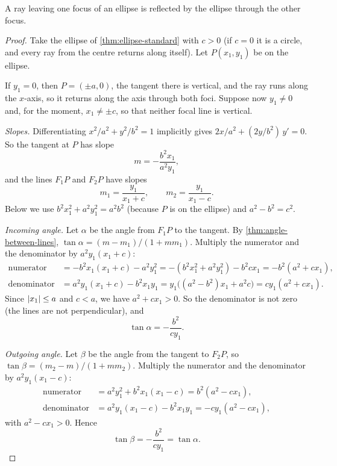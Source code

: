 \begin{theorem}\label{thm:ellipse-reflection}
  A ray leaving one focus of an ellipse is reflected by the ellipse through
  the other focus.
\end{theorem}

\begin{proof}
  Take the ellipse of \cref{thm:ellipse-standard} with $c > 0$ (if $c = 0$
  it is a circle, and every ray from the centre returns along itself). Let
  $P(x_1, y_1)$ be on the ellipse.

  If $y_1 = 0$, then $P = (\pm a, 0)$, the tangent there is vertical, and the
  ray runs along the $x$-axis, so it returns along the axis through both
  foci. Suppose now $y_1 \neq 0$ and, for the moment, $x_1 \neq \pm c$, so
  that neither focal line is vertical.

  \emph{Slopes.} Differentiating $x^2/a^2 + y^2/b^2 = 1$ implicitly gives
  $2x/a^2 + (2y/b^2)\,y' = 0$. So the tangent at $P$ has slope
  \[
    m = -\frac{b^2 x_1}{a^2 y_1},
  \]
  and the lines $F_1P$ and $F_2P$ have slopes
  \[
    m_1 = \frac{y_1}{x_1 + c}, \qquad m_2 = \frac{y_1}{x_1 - c}.
  \]
  Below we use $b^2 x_1^2 + a^2 y_1^2 = a^2 b^2$ (because $P$ is on the
  ellipse) and $a^2 - b^2 = c^2$.

  \emph{Incoming angle.} Let $\alpha$ be the angle from $F_1P$ to the tangent.
  By \cref{thm:angle-between-lines},
  $\tan\alpha = (m - m_1)/(1 + m m_1)$. Multiply the numerator and the
  denominator by $a^2 y_1 (x_1 + c)$:
  \[
    \begin{aligned}
      \text{numerator}
      &= -b^2 x_1 (x_1 + c) - a^2 y_1^2
       = -(b^2 x_1^2 + a^2 y_1^2) - b^2 c x_1
       = -b^2 (a^2 + c x_1), \\
      \text{denominator}
      &= a^2 y_1 (x_1 + c) - b^2 x_1 y_1
       = y_1 \bigl( (a^2 - b^2) x_1 + a^2 c \bigr)
       = c y_1 (a^2 + c x_1).
    \end{aligned}
  \]
  Since $\lvert x_1\rvert \leq a$ and $c < a$, we have $a^2 + c x_1 > 0$. So the
  denominator is not zero (the lines are not perpendicular), and
  \[
    \tan\alpha = -\frac{b^2}{c y_1}.
  \]

  \emph{Outgoing angle.} Let $\beta$ be the angle from the tangent to $F_2P$,
  so $\tan\beta = (m_2 - m)/(1 + m m_2)$. Multiply the numerator and the
  denominator by $a^2 y_1 (x_1 - c)$:
  \[
    \begin{aligned}
      \text{numerator}
      &= a^2 y_1^2 + b^2 x_1 (x_1 - c)
       = b^2 (a^2 - c x_1), \\
      \text{denominator}
      &= a^2 y_1 (x_1 - c) - b^2 x_1 y_1
       = -c y_1 (a^2 - c x_1),
    \end{aligned}
  \]
  with $a^2 - c x_1 > 0$. Hence
  \[
    \tan\beta = -\frac{b^2}{c y_1} = \tan\alpha.
  \]


\end{proof}
